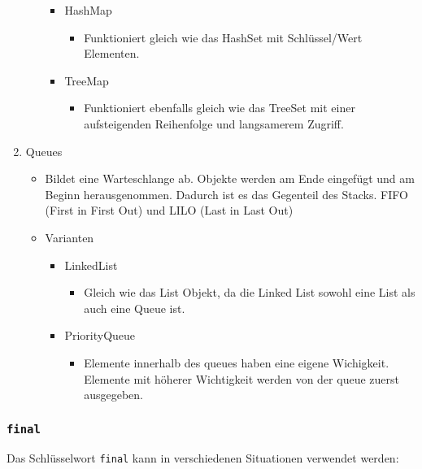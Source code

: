 \documentclass{article}
\begin{document}
\begin{enumerate}
\begin{itemize}
			\begin{itemize}
				\item{HashMap}
				\begin{itemize}
					\item{Funktioniert gleich wie das HashSet mit Schlüssel/Wert Elementen.}
				\end{itemize}
				\item{TreeMap}
				\begin{itemize}
					\item{Funktioniert ebenfalls gleich wie das TreeSet mit einer aufsteigenden Reihenfolge und langsamerem Zugriff.}
				\end{itemize}
			\end{itemize}
		\end{itemize}
		\item{Queues}
		\begin{itemize}
			\item{Bildet eine Warteschlange ab. Objekte werden am Ende eingefügt und am Beginn herausgenommen. Dadurch ist es das Gegenteil des Stacks. FIFO (First in First Out) und LILO (Last in Last Out)}
			\item{Varianten}
			\begin{itemize}
				\item{LinkedList}
				\begin{itemize}
					\item{Gleich wie das List Objekt, da die Linked List sowohl eine List als auch eine Queue ist.}
				\end{itemize}
				\item{PriorityQueue}
				\begin{itemize}
					\item{Elemente innerhalb des queues haben eine eigene Wichigkeit. Elemente mit höherer Wichtigkeit werden von der queue zuerst ausgegeben.}
				\end{itemize}
			\end{itemize}
		\end{itemize}
	\end{enumerate}
	\cprotect\subsubsection{\texorpdfstring{\verb|final|}{}}
	Das Schlüsselwort \verb|final| kann in verschiedenen Situationen verwendet werden:
\end{document}
